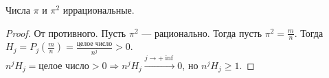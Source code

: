 \begin{theorem}
    Числа $\pi$ и  $\pi^2$ иррациональные.
\end{theorem}
\begin{proof}
    От противного. Пусть $\pi^2$ --- рационально. Тогда пусть  $\pi^2 = \frac{m}{n}$. Тогда $H_j = P_j(\frac{m}{n}) = \frac{\text{целое число}}{n^j} > 0$.\\
    $n^j H_j = \text{целое число} > 0 \Rightarrow n^j H_j \xrightarrow{j \to +\inf} 0$, но $n^j H_j \ge 1$.
\end{proof}
